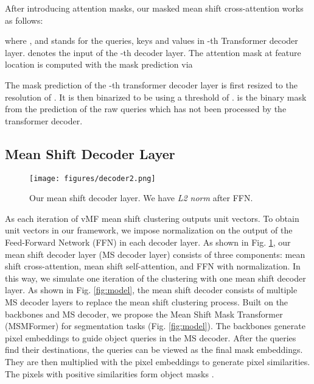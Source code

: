\documentclass[letterpaper, 10 pt, conference]{ieeeconf}
\begin{document}
After introducing attention masks, our masked mean shift cross-attention works as follows:

where ,  and  stands for the queries, keys and values in -th Transformer decoder layer.  denotes the input of the -th decoder layer. The attention mask  \cite{cheng2022masked} at feature location  is computed with the mask prediction  via
\vspace{-2mm}

The mask prediction of the -th transformer decoder layer is first resized to the resolution of . It is then binarized to be  using a threshold of .  is the binary mask from the prediction of the raw queries which has not been processed by the transformer decoder.
\vspace{-2mm}
\subsection{Mean Shift Decoder Layer} 
\vspace{-1mm}
\label{msdecoderlayer}

\begin{figure}
    \centering
\vspace{-6mm}
\texttt{[image: figures/decoder2.png]}
\vspace{-3mm}
\caption{Our mean shift decoder layer. We have \textit{L2 norm} after FFN.}
\label{fig:decoder}
    \vspace{-6mm}
\end{figure}

As each iteration of vMF mean shift clustering outputs unit vectors. To obtain unit vectors in our framework, we impose  normalization on the output of the Feed-Forward Network (FFN) in each decoder layer. As shown in Fig. \ref{fig:decoder}, our mean shift decoder layer (MS decoder layer) consists of three components: mean shift cross-attention, mean shift self-attention, and FFN with  normalization. In this way, we simulate one iteration of the clustering with one mean shift decoder layer. As shown in Fig. \ref{fig:model}, the mean shift decoder consists of multiple MS decoder layers to replace the mean shift clustering process. Built on the backbones and MS decoder, we propose the Mean Shift Mask Transformer (MSMFormer) for segmentation tasks (Fig. \ref{fig:model}). The backbones generate pixel embeddings to guide object queries in the MS decoder. After the queries find their destinations, the queries can be viewed as the final mask embeddings. They are then multiplied with the pixel embeddings to generate pixel similarities. The pixels with positive similarities form object masks \cite{cheng2021per, cheng2022masked}.
\end{document}
